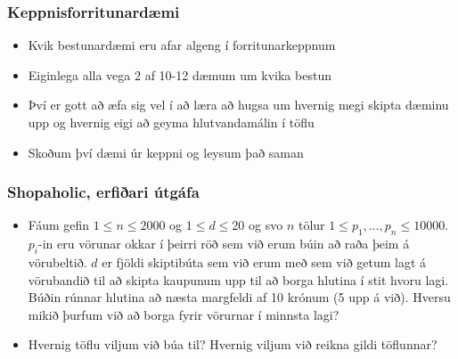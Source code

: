 \documentclass{beamer}
\begin{document}
\begin{frame}
\frametitle{Keppnisforritunardæmi}

\begin{itemize}

\item<1-> Kvik bestunardæmi eru afar algeng í forritunarkeppnum

\item<2-> Eiginlega alla vega 2 af 10-12 dæmum um kvika bestun

\item<3-> Því er gott að æfa sig vel í að læra að hugsa um hvernig megi skipta dæminu upp og hvernig eigi að geyma hlutvandamálin í töflu

\item<4-> Skoðum því dæmi úr keppni og leysum það saman

\end{itemize}

\end{frame}

\begin{frame}
\frametitle{Shopaholic, erfiðari útgáfa}

\begin{itemize}

\item<1-> Fáum gefin $1 \leq n \leq 2000$ og $1 \leq d \leq 20$ og svo $n$ tölur $1 \leq p_1,\dots,p_n \leq 10000$. $p_i$-in eru vörunar okkar í þeirri röð sem við erum búin að raða þeim á vörubeltið. $d$ er fjöldi skiptibúta sem við erum með sem við getum lagt á vörubandið til að skipta kaupunum upp til að borga hlutina í stit hvoru lagi. Búðin rúnnar hlutina að næsta margfeldi af 10 krónum (5 upp á við). Hversu mikið þurfum við að borga fyrir vörurnar í minnsta lagi?

\item<2-> Hvernig töflu viljum við búa til? Hvernig viljum við reikna gildi töflunnar?

\end{itemize}

\end{frame}
\end{document}
